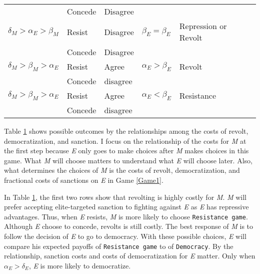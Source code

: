 \documentclass[11pt]{article}
\begin{document}
\begin{table}[!ht]
\begin{tabular}{ p{3cm} p{2cm} p{2cm} p{3cm} p{3cm} }
	     	                                  & Concede  & Disagree &                           &                \\
		$\delta_{M} > \alpha_{E} > \beta_{M}$ & Resist   & Disagree & $\beta_{E} = \beta_{E}$   & Repression or Revolt \\
	                                        & Concede  & Disagree &                           &                \\
		$\delta_{M} > \beta_{M} > \alpha_{E}$	& Resist   & Agree    & $\alpha_{E} > \beta_{E}$  & Revolt         \\
		                                      & Concede  & disagree &                           &                \\
    $\delta_{M} > \beta_{M} > \alpha_{E}$	& Resist   & Agree    & $\alpha_{E} < \beta_{E}$  & Resistance     \\
		                                      & Concede  & disagree &                           &                \\
		\bottomrule
	\end{tabular}
	{\raggedright }
	\label{tab:table1}
\end{table}

Table \ref{tab:table1} shows possible outcomes by the relationships among the costs of revolt, democratization, and sanction. I focus on the relationship of the costs for \textit{M} at the first step because \textit{E} only goes to make choices after \textit{M} makes choices in this game. What \textit{M} will choose matters to understand what \textit{E} will choose later. Also, what determines the choices of \textit{M} is the costs of revolt, democratization, and fractional costs of sanctions on \textit{E} in Game \ref{Game1}.

In Table \ref{tab:table1}, the first two rows show that revolting is highly costly for \textit{M}. \textit{M} will prefer accepting elite-targeted sanction to fighting against \textit{E} as \textit{E} has repressive advantages. Thus, when \textit{E} resists, \textit{M} is more likely to choose \texttt{Resistance game}. Although \textit{E} choose to concede, revolts is still costly. The best response of \textit{M} is to follow the decision of \textit{E} to go to democracy. With these possible choices, \textit{E} will compare his expected payoffs of \texttt{Resistance game} to of \texttt{Democracy}. By the relationship, sanction costs and costs of democratization for \textit{E} matter. Only when $\alpha_{E} > \delta_{E}$, \textit{E} is more likely to democratize.
\end{document}
